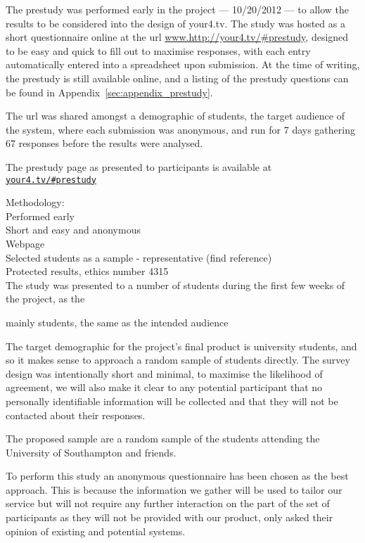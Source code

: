 The prestudy was performed early in the project --- 10/20/2012 --- to allow the results to be considered into the design of your4.tv. The study was hosted as a short questionnaire online at the url \url{www.http://your4.tv/#prestudy}, designed to be easy and quick to fill out to maximise responses, with each entry automatically entered into a spreadsheet upon submission. At the time of writing, the prestudy is still available online, and a listing of the prestudy questions can be found in Appendix~\ref{sec:appendix_prestudy}.

The url was shared amongst a demographic of students, the target audience of the system, where each submission was anonymous, and run for 7 days gathering 67 responses before the results were analysed.

The prestudy page as presented to participants is available at \href{http://your4.tv/\#prestudy}{\texttt{your4.tv/\#prestudy}} 

Methodology:\\
Performed early\\
Short and easy and anonymous\\
Webpage\\
Selected students as a sample - representative (find reference)\\
Protected results, ethics number 4315\\



The study was presented to a number of students during the first few weeks of the project, as the 

mainly students, the same as the intended audience


The target demographic for the project's final product is university students, and so it makes sense to approach a random sample of students directly. The survey design was intentionally short and minimal, to maximise the likelihood of agreement, we will also make it clear to any potential participant that no personally identifiable information will be collected and that they will not be contacted about their responses. %

The proposed sample are a random sample of the students attending the University of Southampton and friends.


To perform this study an anonymous questionnaire has been chosen as the best approach. This is because the information we gather will be used to tailor our service but will not require any further interaction on the part of the set of participants as they will not be provided with our product, only asked their opinion of existing and potential systems.



